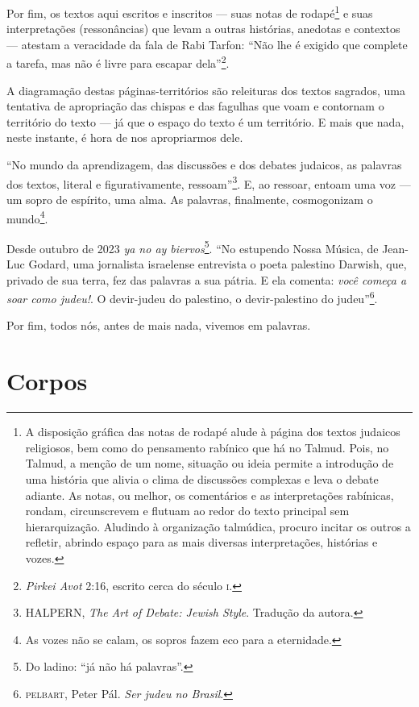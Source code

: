 Por fim, os textos aqui escritos e inscritos --- suas notas de
rodapé\footnote{A disposição gráfica das notas de rodapé alude à página
  dos textos judaicos religiosos, bem como do pensamento rabínico que há
  no Talmud. Pois, no Talmud, a menção de um nome,
  situação ou ideia permite a introdução de uma história que alivia o
  clima de discussões complexas e leva o debate adiante. As notas, ou
  melhor, os comentários e as interpretações rabínicas, rondam,
  circunscrevem e flutuam ao redor do texto principal sem
  hierarquização. Aludindo à organização talmúdica, procuro
  incitar os outros a refletir, abrindo espaço para as mais diversas
  interpretações, histórias e vozes.} e suas interpretações
(ressonâncias) que levam a outras histórias, anedotas e contextos ---
atestam a veracidade da fala de Rabi Tarfon: ``Não lhe é exigido
que complete a tarefa, mas não é livre para escapar dela''\footnote{\emph{Pirkei
  Avot} 2:16, escrito cerca do século \textsc{i}.}.

A diagramação destas páginas-territórios são releituras dos textos
sagrados, uma tentativa de apropriação das chispas e das fagulhas que
voam e contornam o território do texto --- já que o espaço do texto é um
território. E mais que nada, neste instante, é hora de nos apropriarmos
dele.

\begin{center}\end{center}

\noindent{}``No mundo da aprendizagem, das discussões e dos debates judaicos,
as palavras dos textos, literal e figurativamente,
ressoam''\footnote{HALPERN, \emph{The Art of Debate: Jewish Style}. Tradução da autora.}. E, ao ressoar, entoam uma voz --- um sopro de
espírito, uma alma. As palavras, finalmente, cosmogonizam o
mundo\footnote{As vozes não se calam, os sopros fazem eco para a
  eternidade.}.

Desde outubro de 2023 \emph{ya no ay biervos}\footnote{Do ladino: ``já
  não há palavras''.}. ``No estupendo Nossa Música, de Jean-Luc
Godard, uma jornalista israelense entrevista o poeta palestino Darwish,
que, privado de sua terra, fez das palavras a sua pátria. E ela comenta:
\emph{você começa a soar como judeu!}. O devir-judeu do palestino, o
devir-palestino do judeu''\footnote{\textsc{pelbart}, Peter Pál. \emph{Ser judeu
  no Brasil}.}.

Por fim, todos nós, antes de mais nada, vivemos em palavras.

\chapter{Corpos}

